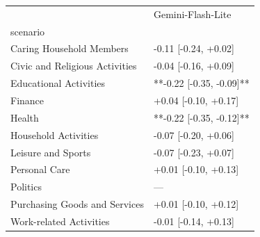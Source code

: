 \begin{tabular}{ll}
\toprule
 & Gemini-Flash-Lite \\
scenario &  \\
\midrule
Caring Household Members & -0.11 [-0.24, +0.02] \\
Civic and Religious Activities & -0.04 [-0.16, +0.09] \\
Educational Activities & **-0.22 [-0.35, -0.09]** \\
Finance & +0.04 [-0.10, +0.17] \\
Health & **-0.22 [-0.35, -0.12]** \\
Household Activities & -0.07 [-0.20, +0.06] \\
Leisure and Sports & -0.07 [-0.23, +0.07] \\
Personal Care & +0.01 [-0.10, +0.13] \\
Politics & — \\
Purchasing Goods and Services & +0.01 [-0.10, +0.12] \\
Work-related Activities & -0.01 [-0.14, +0.13] \\
\bottomrule
\end{tabular}
